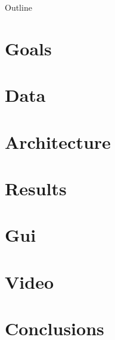 

%


    \frame{\titlepage}
    \begin{frame}{Outline}
        \tableofcontents[hideallsubsections]
    \end{frame}

    \section{Goals}\label{sec:goals}
    

    \section{Data}\label{sec:Data}
    

    \section{Architecture}\label{sec:architecture}
    

    \section{Results}\label{sec:results}
    

    \section{Gui}\label{sec:gui}
    

    \section{Video}\label{sec:video}
    

    \section{Conclusions}\label{sec:conclusions}
    

